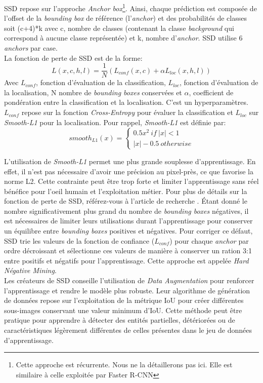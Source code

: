 \noindent SSD repose sur l'approche \textit{Anchor box}\footnote{Cette approche est récurrente. Nous ne la détaillerons pas ici. Elle est similaire à celle exploitée par Faster R-CNN}. Ainsi, chaque prédiction est composée de l'offset de la \textit{bounding box} de référence (l'\textit{anchor}) et des probabilités de classes soit (c+4)*k avec c, nombre de classes (contenant la classe \textit{background} qui correspond à aucune classe représentée) et k, nombre d'\textit{anchor}. SSD utilise 6 \textit{anchors} par case.\\

\noindent La fonction de perte de SSD est de la forme:
$$L(x,c,h,l)=\frac{1}{N}(L_{conf}(x,c)+\alpha L_{loc}(x,h,l))$$
Avec $L_{conf}$, fonction d'évaluation de la classification, $L_{loc}$, fonction d'évaluation de la localisation, N nombre de \textit{bounding boxes} conservées et $\alpha$, coefficient de pondération entre la classification et la localisation. C'est un hyperparamètres. $L_{conf}$ repose sur la fonction \textit{Cross-Entropy} pour évaluer la classification et $L_{loc}$ sur \textit{Smooth-L1} pour la localisation. Pour rappel, \textit{Smooth-L1} est définie par:
$$smooth_{L1}(x)=\left\{ \begin{array}{ll} 0.5x^2 \ if \ |x| < 1\\ |x|-0.5 \ otherwise \end{array} \right. $$

\noindent L'utilisation de \textit{Smooth-L1} permet une plus grande souplesse d'apprentissage. En effet, il n'est pas nécessaire d'avoir une précision au pixel-près, ce que favorise la norme L2. Cette contrainte peut être trop forte et limiter l'apprentissage sans réel bénéfice pour l'oeil humain et l'exploitation métier. Pour plus de détails sur la fonction de perte de SSD, référez-vous à l'article de recherche \cite{ssd_deep}. Étant donné le nombre significativement plus grand du nombre de \textit{bounding boxes} négatives, il est nécessaires de limiter leurs utilisations durant l'apprentissage pour conserver un équilibre entre \textit{bounding boxes} positives et négatives. Pour corriger ce défaut, SSD trie les valeurs de la fonction de confiance ($L_{conf}$) pour chaque \textit{anchor} par ordre décroissant et sélectionne ces valeurs de manière à conserver un ration 3:1 entre positifs et négatifs pour l'apprentissage. Cette approche est appelée \textit{Hard Négative Mining}.\\

\noindent Les créateurs de SSD conseille l'utilisation de \textit{Data Augmentation} pour renforcer l'apprentissage et rendre le modèle plus robuste. Leur algorithme de génération de données repose sur l'exploitation de la métrique IoU pour créer différentes sous-images conservant une valeur minimum d'IoU. Cette méthode peut être pratique pour apprendre à détecter des entités partielles, détériorées ou de caractéristiques légèrement différentes de celles présentes dans le jeu de données d'apprentissage.

